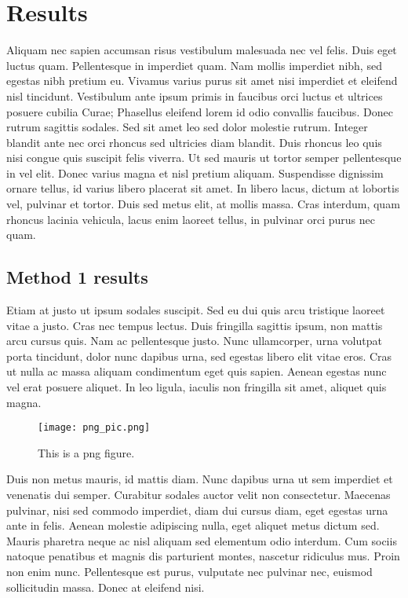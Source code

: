\documentclass[12pt, a4paper]{article}
\begin{document}
\section{Results}
\label{sec:results}

Aliquam nec sapien accumsan risus vestibulum malesuada nec vel felis. Duis eget luctus quam. Pellentesque in imperdiet quam. Nam mollis imperdiet nibh, sed egestas nibh pretium eu. Vivamus varius purus sit amet nisi imperdiet et eleifend nisl tincidunt. Vestibulum ante ipsum primis in faucibus orci luctus et ultrices posuere cubilia Curae; Phasellus eleifend lorem id odio convallis faucibus. Donec rutrum sagittis sodales. Sed sit amet leo sed dolor molestie rutrum. Integer blandit ante nec orci rhoncus sed ultricies diam blandit. Duis rhoncus leo quis nisi congue quis suscipit felis viverra. Ut sed mauris ut tortor semper pellentesque in vel elit. Donec varius magna et nisl pretium aliquam. Suspendisse dignissim ornare tellus, id varius libero placerat sit amet. In libero lacus, dictum at lobortis vel, pulvinar et tortor. Duis sed metus elit, at mollis massa. Cras interdum, quam rhoncus lacinia vehicula, lacus enim laoreet tellus, in pulvinar orci purus nec quam.

\subsection{Method 1 results}
\label{subsec:results:1}

Etiam at justo ut ipsum sodales suscipit. Sed eu dui quis arcu tristique laoreet vitae a justo. Cras nec tempus lectus. Duis fringilla sagittis ipsum, non mattis arcu cursus quis. Nam ac pellentesque justo. Nunc ullamcorper, urna volutpat porta tincidunt, dolor nunc dapibus urna, sed egestas libero elit vitae eros. Cras ut nulla ac massa aliquam condimentum eget quis sapien. Aenean egestas nunc vel erat posuere aliquet. In leo ligula, iaculis non fringilla sit amet, aliquet quis magna.

\begin{figure}
   \begin{center}
      \texttt{[image: png\_pic.png]}
   \end{center}
   \caption{This is a png figure.}
   \label{fig:1}
\end{figure}

Duis non metus mauris, id mattis diam. Nunc dapibus urna ut sem imperdiet et venenatis dui semper. Curabitur sodales auctor velit non consectetur. Maecenas pulvinar, nisi sed commodo imperdiet, diam dui cursus diam, eget egestas urna ante in felis. Aenean molestie adipiscing nulla, eget aliquet metus dictum sed. Mauris pharetra neque ac nisl aliquam sed elementum odio interdum. Cum sociis natoque penatibus et magnis dis parturient montes, nascetur ridiculus mus. Proin non enim nunc. Pellentesque est purus, vulputate nec pulvinar nec, euismod sollicitudin massa. Donec at eleifend nisi.
\end{document}
